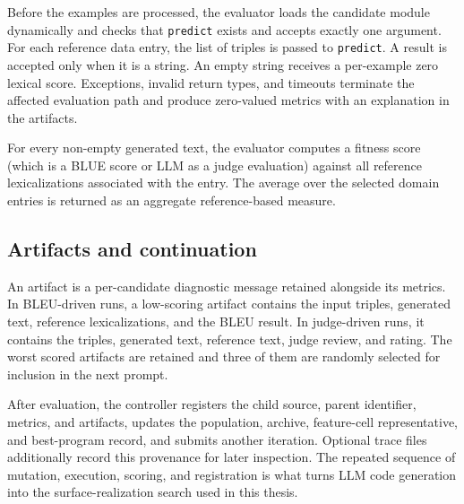 Before the examples are processed, the evaluator loads the candidate module
dynamically and checks that \texttt{predict} exists and accepts exactly one
argument. For each reference data entry, the list of triples is passed to
\texttt{predict}. A result is accepted only when it is a string. An empty
string receives a per-example zero lexical score. Exceptions, invalid return types, and timeouts terminate the
affected evaluation path and produce zero-valued metrics with an explanation in
the artifacts.

For every non-empty generated text, the evaluator computes a fitness score (which is a BLUE score or LLM as a judge evaluation) against
all reference lexicalizations associated with the entry. The average over the
selected domain entries is returned as an aggregate reference-based measure.

\subsection{Artifacts and continuation}

An artifact is a per-candidate diagnostic message retained alongside its metrics.
In BLEU-driven runs, a low-scoring artifact contains the input triples, generated
text, reference lexicalizations, and the BLEU result. In judge-driven runs, it
contains the triples, generated text, reference text, judge review, and rating.
The worst scored artifacts are retained and three of them are randomly selected for inclusion in the next prompt.

After evaluation, the controller registers the child source, parent identifier,
metrics, and artifacts, updates the population, archive, feature-cell
representative, and best-program record, and submits another iteration. Optional
trace files additionally record this provenance for later inspection. The
repeated sequence of mutation, execution, scoring, and registration is what
turns LLM code generation into the surface-realization search used in this
thesis.
